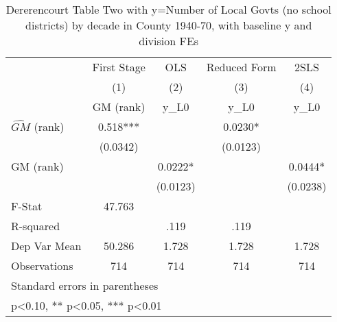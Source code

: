\begin{table}[htbp]\centering
\def\sym#1{\ifmmode^{#1}\else\(^{#1}\)\fi}
\caption{Dererencourt Table Two with y=Number of Local Govts (no school districts) by decade in County 1940-70, with baseline y and division FEs}
\begin{tabular}{l*{4}{c}}
\toprule
                    & First Stage   &         OLS   &Reduced Form   &        2SLS   \\
                    &\multicolumn{1}{c}{(1)}&\multicolumn{1}{c}{(2)}&\multicolumn{1}{c}{(3)}&\multicolumn{1}{c}{(4)}\\
                    &\multicolumn{1}{c}{GM  (rank)}&\multicolumn{1}{c}{y\_L0}&\multicolumn{1}{c}{y\_L0}&\multicolumn{1}{c}{y\_L0}\\
\midrule
$\hat{GM}$ (rank)   &       0.518***&               &      0.0230*  &               \\
                    &    (0.0342)   &               &    (0.0123)   &               \\
\addlinespace
GM  (rank)          &               &      0.0222*  &               &      0.0444*  \\
                    &               &    (0.0123)   &               &    (0.0238)   \\
\midrule
F-Stat              &      47.763   &               &               &               \\
R-squared           &               &        .119   &        .119   &               \\
Dep Var Mean        &      50.286   &       1.728   &       1.728   &       1.728   \\
Observations        &         714   &         714   &         714   &         714   \\
\bottomrule
\multicolumn{5}{l}{\footnotesize Standard errors in parentheses}\\
\multicolumn{5}{l}{\footnotesize * p<0.10, ** p<0.05, *** p<0.01}\\
\end{tabular}
\end{table}
